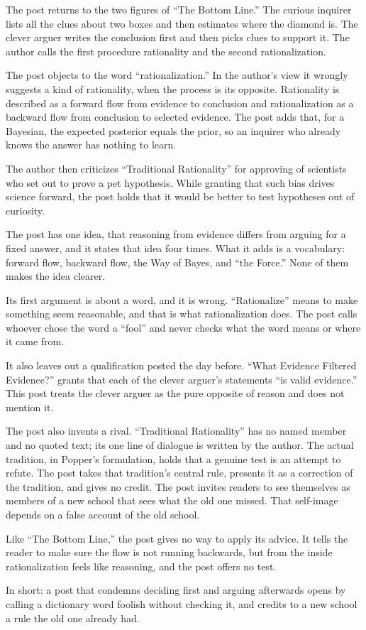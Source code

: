 \begin{afterword}
\summaryhead

The post returns to the two figures of ``The Bottom Line.'' The curious inquirer lists all the clues about two boxes and then estimates where the diamond is. The clever arguer writes the conclusion first and then picks clues to support it. The author calls the first procedure rationality and the second rationalization.

The post objects to the word ``rationalization.'' In the author's view it wrongly suggests a kind of rationality, when the process is its opposite. Rationality is described as a forward flow from evidence to conclusion and rationalization as a backward flow from conclusion to selected evidence. The post adds that, for a Bayesian, the expected posterior equals the prior, so an inquirer who already knows the answer has nothing to learn.

The author then criticizes ``Traditional Rationality'' for approving of scientists who set out to prove a pet hypothesis. While granting that such bias drives science forward, the post holds that it would be better to test hypotheses out of curiosity.

\responsehead

The post has one idea, that reasoning from evidence differs from arguing for a fixed answer, and it states that idea four times. What it adds is a vocabulary: forward flow, backward flow, the Way of Bayes, and ``the Force.'' None of them makes the idea clearer.

Its first argument is about a word, and it is wrong. ``Rationalize'' means to make something seem reasonable, and that is what rationalization does. The post calls whoever chose the word a ``fool'' and never checks what the word means or where it came from.

It also leaves out a qualification posted the day before. ``What Evidence Filtered Evidence?'' grants that each of the clever arguer's statements ``is valid evidence.'' This post treats the clever arguer as the pure opposite of reason and does not mention it.

The post also invents a rival. ``Traditional Rationality'' has no named member and no quoted text; its one line of dialogue is written by the author. The actual tradition, in Popper's formulation, holds that a genuine test is an attempt to refute. The post takes that tradition's central rule, presents it as a correction of the tradition, and gives no credit. The post invites readers to see themselves as members of a new school that sees what the old one missed. That self-image depends on a false account of the old school.

Like ``The Bottom Line,'' the post gives no way to apply its advice. It tells the reader to make sure the flow is not running backwards, but from the inside rationalization feels like reasoning, and the post offers no test.

In short: a post that condemns deciding first and arguing afterwards opens by calling a dictionary word foolish without checking it, and credits to a new school a rule the old one already had.
\end{afterword}
